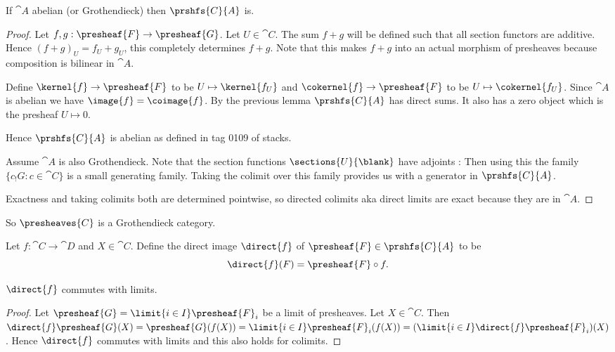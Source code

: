 \begin{lemma}
If $\cat{A}$ abelian (or Grothendieck) then $\prshfs{C}{A}$ is.
\end{lemma}
\begin{proof}
Let $f,g:\presheaf{F} \rightarrow \presheaf{G}$. Let $U\in \cat{C}$.
The sum $f+g$ will be defined such that all section functors are additive. Hence $(f+g)_U =f_U+g_U$, this completely determines $f+g$. Note that this makes $f+g$ into an actual morphism of presheaves because composition is bilinear in $\cat{A}$.

Define $\kernel{f} \rightarrow \presheaf{F}$ to be $U \mapsto \kernel{f_U}$
and $\cokernel{f} \rightarrow \presheaf{F}$ to be $U \mapsto \cokernel{f_U}$.
Since $\cat{A}$ is abelian we have $\image{f} = \coimage{f}$.
By the previous lemma $\prshfs{C}{A}$ has direct sums. It also has a zero object which is the presheaf $U\mapsto 0$.

Hence $\prshfs{C}{A}$ is abelian as defined in tag 0109 of stacks.

Assume $\cat{A}$ is also Grothendieck. Note that the section functions $\sections{U}{\blank}$ have adjoints : %
Then using this the family $\{c_!G: c\in \cat{C}\}$ is a small generating family. Taking the colimit over this family provides us with a generator in $\prshfs{C}{A}$.

Exactness and taking colimits both are determined pointwise, so directed colimits aka direct limits are exact because they are in $\cat{A}$.

\end{proof}

\begin{remark}
So $\presheaves{C}$ is a Grothendieck category.
\end{remark}

\begin{definition}
Let $f:\cat{C}\rightarrow \cat{D}$ and $X\in \cat{C}$. 
Define the direct image $\direct{f}$ of $\presheaf{F}\in \prshfs{C}{A}$ to be 
\[\direct{f}(F) = \presheaf{F} \circ f.\]
\end{definition}

\begin{lemma}
$\direct{f}$ commutes with limits.
\end{lemma}
\begin{proof}
Let $\presheaf{G}=\limit{i\in I} \presheaf{F}_i$ be a limit of presheaves.
Let $X\in \cat{C}$. Then 
$\direct{f}\presheaf{G}(X) = \presheaf{G}(f(X)) = \limit{i\in I} \presheaf{F}_i(f(X)) = (\limit{i\in I} \direct{f}\presheaf{F}_i)(X)$. 
Hence $\direct{f}$ commutes with limits and this also holds for colimits.
\end{proof}


